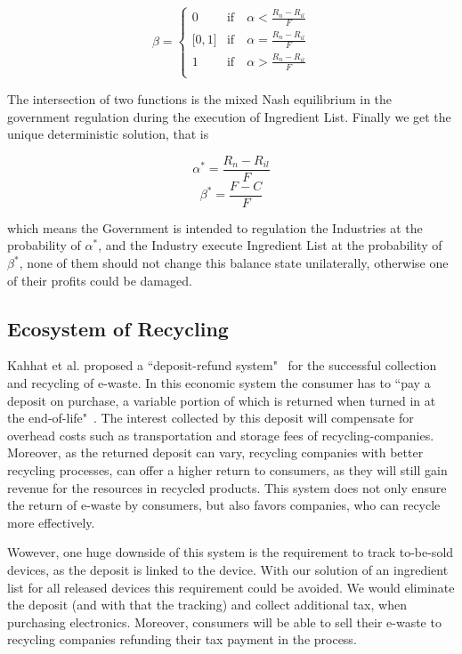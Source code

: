 \begin{equation}
\beta = \left\{
\begin{array}{ll}
0 & \text{if} \quad \alpha < \frac{R_n-R_{il}}{F} \\
\lbrack 0, 1 \rbrack & \text{if} \quad \alpha = \frac{R_n-R_{il}}{F} \\
1 & \text{if} \quad \alpha > \frac{R_n-R_{il}}{F} \\
\end{array}
\right.
\end{equation}


The intersection of two functions is the mixed Nash equilibrium in the government regulation 
during the execution of Ingredient List. Finally we get the unique deterministic solution, that is 

\[
\alpha^* = \frac{R_n - R_{il}}{F}
\]
\[
\beta^* =  \frac{F - C}{F}
\]

which means the Government is intended to regulation the Industries at the probability of $\alpha^*$, 
and the Industry execute Ingredient List at the probability of $\beta^*$, none of them should not 
change this balance state unilaterally, otherwise one of their profits could be damaged.
 
\subsection{Ecosystem of Recycling}
Kahhat et al. proposed a ``deposit-refund system"~\cite{kahhat2008exploring} for the successful collection and 
recycling of e-waste. In this economic system the consumer has to 
``pay a deposit on purchase, a variable portion of which is returned when turned in at the end-of-life"~\cite{plambeck2009effects}. 
The interest collected by this deposit will compensate for overhead costs such as transportation 
and storage fees of recycling-companies. Moreover, as the returned deposit can vary, 
recycling companies with better recycling processes, can offer a higher return to consumers, 
as they will still gain revenue for the resources in recycled products. 
This system does not only ensure the return of e-waste by consumers, 
but also favors companies, who can recycle more effectively.

Wowever, one huge downside of this system is the requirement to track to-be-sold devices, 
as the deposit is linked to the device. With our solution of an ingredient list for 
all released devices  this requirement could be avoided. We would eliminate the deposit 
(and with that the tracking) and collect additional tax, when purchasing electronics. 
Moreover, consumers will be able to sell their e-waste to recycling companies refunding their tax payment in the process. 

